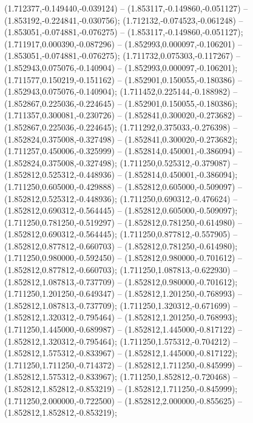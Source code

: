  (1.712377,-0.149440,-0.039124) -- (1.853117,-0.149860,-0.051127) -- (1.853192,-0.224841,-0.030756);
 (1.712132,-0.074523,-0.061248) -- (1.853051,-0.074881,-0.076275) -- (1.853117,-0.149860,-0.051127);
 (1.711917,0.000390,-0.087296) -- (1.852993,0.000097,-0.106201) -- (1.853051,-0.074881,-0.076275);
 (1.711732,0.075303,-0.117267) -- (1.852943,0.075076,-0.140904) -- (1.852993,0.000097,-0.106201);
 (1.711577,0.150219,-0.151162) -- (1.852901,0.150055,-0.180386) -- (1.852943,0.075076,-0.140904);
 (1.711452,0.225144,-0.188982) -- (1.852867,0.225036,-0.224645) -- (1.852901,0.150055,-0.180386);
 (1.711357,0.300081,-0.230726) -- (1.852841,0.300020,-0.273682) -- (1.852867,0.225036,-0.224645);
 (1.711292,0.375033,-0.276398) -- (1.852824,0.375008,-0.327498) -- (1.852841,0.300020,-0.273682);
 (1.711257,0.450006,-0.325999) -- (1.852814,0.450001,-0.386094) -- (1.852824,0.375008,-0.327498);
 (1.711250,0.525312,-0.379087) -- (1.852812,0.525312,-0.448936) -- (1.852814,0.450001,-0.386094);
 (1.711250,0.605000,-0.429888) -- (1.852812,0.605000,-0.509097) -- (1.852812,0.525312,-0.448936);
 (1.711250,0.690312,-0.476624) -- (1.852812,0.690312,-0.564445) -- (1.852812,0.605000,-0.509097);
 (1.711250,0.781250,-0.519297) -- (1.852812,0.781250,-0.614980) -- (1.852812,0.690312,-0.564445);
 (1.711250,0.877812,-0.557905) -- (1.852812,0.877812,-0.660703) -- (1.852812,0.781250,-0.614980);
 (1.711250,0.980000,-0.592450) -- (1.852812,0.980000,-0.701612) -- (1.852812,0.877812,-0.660703);
 (1.711250,1.087813,-0.622930) -- (1.852812,1.087813,-0.737709) -- (1.852812,0.980000,-0.701612);
 (1.711250,1.201250,-0.649347) -- (1.852812,1.201250,-0.768993) -- (1.852812,1.087813,-0.737709);
 (1.711250,1.320312,-0.671699) -- (1.852812,1.320312,-0.795464) -- (1.852812,1.201250,-0.768993);
 (1.711250,1.445000,-0.689987) -- (1.852812,1.445000,-0.817122) -- (1.852812,1.320312,-0.795464);
 (1.711250,1.575312,-0.704212) -- (1.852812,1.575312,-0.833967) -- (1.852812,1.445000,-0.817122);
 (1.711250,1.711250,-0.714372) -- (1.852812,1.711250,-0.845999) -- (1.852812,1.575312,-0.833967);
 (1.711250,1.852812,-0.720468) -- (1.852812,1.852812,-0.853219) -- (1.852812,1.711250,-0.845999);
 (1.711250,2.000000,-0.722500) -- (1.852812,2.000000,-0.855625) -- (1.852812,1.852812,-0.853219);
